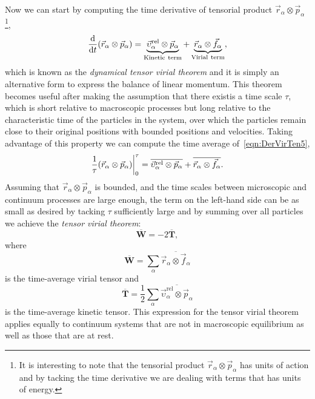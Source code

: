 Now we can start by computing the time derivative of tensorial product $\vec{r}_\alpha\otimes\vec{p}_\alpha$\footnote{It is interesting to note that the tensorial product $\vec{r}_\alpha\otimes\vec{p}_\alpha$ has units of action and by tacking the time derivative we are dealing with terms that has units of energy.
},
\begin{equation}
    \dv{t}\qty(\vec{r}_\alpha\otimes\vec{p}_\alpha) = 
    \underbrace{\vec{\upsilon}_\alpha^{\mathrm{rel}}\otimes\vec{p}_\alpha}_{\mathrm{Kinetic~term}} 
        +
        \underbrace{\vec{r}_\alpha\otimes\vec{f}_\alpha}_{\mathrm{Virial~term}},\label{eqn:DerVirTen5}
\end{equation}
which is known as the \textit{dynamical tensor virial theorem} and it is simply an alternative form to express the balance of linear momentum.
This theorem becomes useful after making the assumption that there existis a time scale $\tau$, which is short relative to macroscopic processes but long relative to the characteristic time of the particles in the system, over which the particles remain close to their original positions with bounded positions and velocities.
Taking advantage of this property we can compute the time average of~\eqref{eqn:DerVirTen5},
\begin{equation}
    \frac{1}{\tau}\qty(\vec{r}_\alpha\otimes\vec{p}_\alpha)\bigg|_{0}^{\tau} = 
    \overline{\vec{\upsilon}_\alpha^{\mathrm{rel}}\otimes\vec{p}_\alpha} 
        +
    \overline{\vec{r}_\alpha\otimes\vec{f}_\alpha}.\label{eqn:DerVirTen6}
\end{equation}
Assuming that $\vec{r}_\alpha\otimes\vec{p}_\alpha$ is bounded, and the time scales between microscopic and continuum processes are large enough, the term on the left-hand side can be as small as desired by tacking $\tau$ sufficiently large and by summing over all particles we achieve the \textit{tensor virial theorem}:
\begin{equation}
    \overline{\mathbf{W}} = -2\overline{\mathbf{T}},\label{eqn:DerVirTen7}
\end{equation}
where
\begin{equation}
    \overline{\mathbf{W}} = \sum_\alpha\overline{\vec{r}_\alpha\otimes\vec{f}_\alpha}\label{eqn:DerVirTen8}
\end{equation}
is the time-average virial tensor and
\begin{equation}
    \overline{\mathbf{T}}=\frac{1}{2}\sum_\alpha\overline{\vec{\upsilon}_\alpha^{\mathrm{rel}}\otimes\vec{p}_\alpha}\label{eqn:DerVirTen9}
\end{equation}
is the time-average kinetic tensor.
This expression for the tensor virial theorem applies equally to continuum systems that are not in macroscopic equilibrium as well as those that are at rest.

